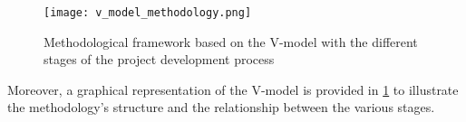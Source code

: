 \begin{figure}
  \texttt{[image: v\_model\_methodology.png]}
  \caption{Methodological framework based on the V-model with the different stages of the project development process\autocite{ruddle2020vmodel}}
  \label{fig:v_model_methodology}
\end{figure}


Moreover, a graphical representation of the V-model is provided in \cref{fig:v_model_methodology} to illustrate the methodology's structure and the relationship between the various stages.
